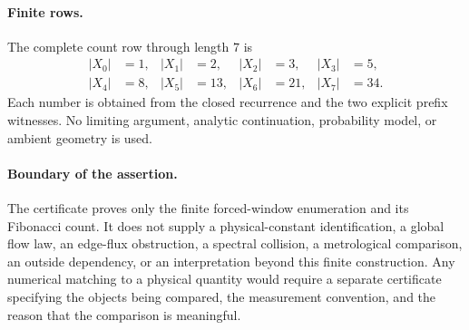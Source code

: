 \paragraph{Finite rows.}
The complete count row through length $7$ is
$$
\begin{aligned}
 |X_0|&=1, & |X_1|&=2, & |X_2|&=3, & |X_3|&=5,\\
 |X_4|&=8, & |X_5|&=13, & |X_6|&=21, & |X_7|&=34.
\end{aligned}
$$
Each number is obtained from the closed recurrence and the two explicit prefix witnesses. No limiting argument, analytic continuation, probability model, or ambient geometry is used.

\paragraph{Boundary of the assertion.}
The certificate proves only the finite forced-window enumeration and its Fibonacci count. It does not supply a physical-constant identification, a global flow law, an edge-flux obstruction, a spectral collision, a metrological comparison, an outside dependency, or an interpretation beyond this finite construction. Any numerical matching to a physical quantity would require a separate certificate specifying the objects being compared, the measurement convention, and the reason that the comparison is meaningful.